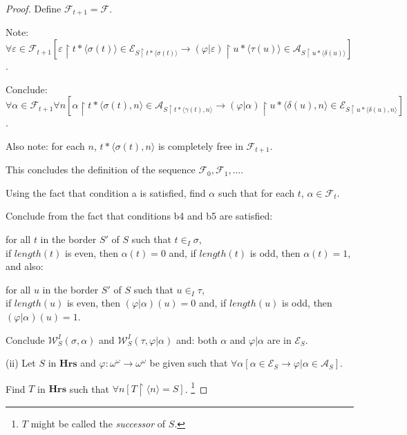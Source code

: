 \documentclass[a4paper]{amsart}
\theoremstyle{plain}
\begin{document}
\begin{proof}
Define $\mathcal{F}_{t+1} =\mathcal{F}$.


Note: $\forall \varepsilon \in \mathcal{F}_{t+1}[\varepsilon\upharpoonright t\ast\langle\sigma(t)\rangle \in \mathcal{E}_{S\upharpoonright t\ast\langle \sigma(t)\rangle }\rightarrow(\varphi|\varepsilon)\upharpoonright u\ast\langle\tau(u)\rangle \in \mathcal{A}_{S\upharpoonright u\ast\langle \delta(u)\rangle }]$. 
 
 
 Conclude: \\$\forall \alpha \in \mathcal{F}_{t+1}\forall n[\alpha\upharpoonright t\ast\langle\sigma(t),n\rangle \in \mathcal{A}_{S\upharpoonright t\ast\langle \gamma(t),n\rangle }\rightarrow(\varphi|\alpha)\upharpoonright u\ast\langle\delta(u), n\rangle \in \mathcal{E}_{S\upharpoonright u\ast\langle \delta(u),n\rangle }]$.
 
 Also note: for each $n$, $t\ast\langle\sigma(t), n\rangle$ is completely free in $\mathcal{F}_{t+1}$.
 
 \smallskip  This concludes the definition of the sequence $\mathcal{F}_0, \mathcal{F}_1, \ldots$.
 
 \bigskip Using the fact that  condition a is satisfied, find $\alpha$ such that for each $t$, $\alpha\in \mathcal{F}_t$. 
 

 
 
 \medskip Conclude from the fact that conditions b4 and b5 are satisfied: 
 
 for all $t$ in the border $S'$ of $S$ such that $t\in_I\sigma$, \\if  $length(t)$ is even, then $\alpha(t)=0$ and, if $length(t)$ is odd, then $\alpha(t)=1$, and also:  
 
 for all $u$ in the border $S'$ of $S$ such that $u\in_I\tau$, \\if  $length(u)$ is even, then $(\varphi|\alpha)(u)=0$ and, if $length(u)$ is odd, then $(\varphi|\alpha)(u)=1$.
 
 Conclude $\mathcal{W}^{I}_S(\sigma, \alpha)$ and $\mathcal{W}^{I}_S(\tau, \varphi|\alpha)$ and: both $\alpha$ and  $\varphi|\alpha$ are in $\mathcal{E}_S$. 
 
 \bigskip (ii) Let $S$ in $\mathbf{Hrs}$ and $\varphi:\omega^\omega\rightarrow \omega^\omega$ be given such that $\forall \alpha[\alpha \in \mathcal{E}_S \rightarrow \varphi|\alpha \in \mathcal{A}_S]$.
 
 Find $T$ in $\mathbf{Hrs}$ such that $\forall n[T\upharpoonright\langle n \rangle = S]$.
\footnote{$T$ might be called the {\it successor } of $S$.} 
 

\end{proof}
\end{document}
